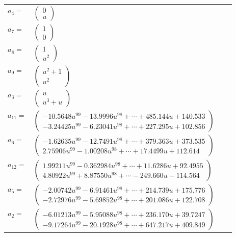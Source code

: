 \documentclass[1p]{elsarticle_modified}
\theoremstyle{definition}
\begin{document}
\begin{tabular}{m{7pt} m{180pt} m{7pt} m{180pt} }
\flushright $a_{4}=$&$\begin{pmatrix}0\\u\end{pmatrix}$ \\
\flushright $a_{7}=$&$\begin{pmatrix}1\\0\end{pmatrix}$ \\
\flushright $a_{8}=$&$\begin{pmatrix}1\\u^2\end{pmatrix}$ \\
\flushright $a_{9}=$&$\begin{pmatrix}u^2+1\\u^2\end{pmatrix}$ \\
\flushright $a_{3}=$&$\begin{pmatrix}u\\u^3+u\end{pmatrix}$ \\
\flushright $a_{11}=$&$\begin{pmatrix}-10.5648 u^{99}-13.9996 u^{98}+\cdots+485.144 u+140.533\\-3.24425 u^{99}-6.23041 u^{98}+\cdots+227.295 u+102.856\end{pmatrix}$ \\
\flushright $a_{6}=$&$\begin{pmatrix}-1.62635 u^{99}-12.7491 u^{98}+\cdots+379.363 u+373.535\\2.75906 u^{99}-1.00208 u^{98}+\cdots+17.4499 u+112.614\end{pmatrix}$ \\
\flushright $a_{12}=$&$\begin{pmatrix}1.99211 u^{99}-0.362984 u^{98}+\cdots+11.6286 u+92.4955\\4.80922 u^{99}+8.87550 u^{98}+\cdots-249.660 u-114.564\end{pmatrix}$ \\
\flushright $a_{5}=$&$\begin{pmatrix}-2.00742 u^{99}-6.91461 u^{98}+\cdots+214.739 u+175.776\\-2.72976 u^{99}-5.69852 u^{98}+\cdots+201.086 u+122.708\end{pmatrix}$ \\
\flushright $a_{2}=$&$\begin{pmatrix}-6.01213 u^{99}-5.95088 u^{98}+\cdots+236.170 u+39.7247\\-9.17264 u^{99}-20.1928 u^{98}+\cdots+647.217 u+409.849\end{pmatrix}$ \\

\end{tabular}
\end{document}
